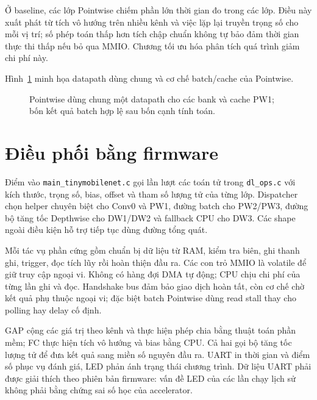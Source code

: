 Ở baseline, các lớp Pointwise chiếm phần lớn thời gian đo trong các lớp. Điều này xuất phát từ tích vô hướng trên nhiều kênh và việc lặp lại truyền trọng số cho mỗi vị trí; số phép toán thấp hơn tích chập chuẩn không tự bảo đảm thời gian thực thi thấp nếu bỏ qua MMIO. Chương tối ưu hóa phân tích quá trình giảm chi phí này.

Hình~\ref{fig:pw-placeholder} minh họa datapath dùng chung và cơ chế batch/cache của Pointwise.

\begin{figure}[!ht]
\captionsetup{aboveskip=6pt,belowskip=0pt}
\centering
\resizebox{0.93\textwidth}{!}{}
\caption{Pointwise dùng chung một datapath cho các bank và cache PW1; bốn kết quả batch hợp lệ sau bốn cạnh tính toán.}
\label{fig:pw-placeholder}
\end{figure}

\section{Điều phối bằng firmware}
Điểm vào \texttt{main\_tinymobilenet.c} gọi lần lượt các toán tử trong \texttt{dl\_ops.c} với kích thước, trọng số, bias, offset và tham số lượng tử của từng lớp. Dispatcher chọn helper chuyên biệt cho Conv0 và PW1, đường batch cho PW2/PW3, đường bộ tăng tốc Depthwise cho DW1/DW2 và fallback CPU cho DW3. Các shape ngoài điều kiện hỗ trợ tiếp tục dùng đường tổng quát.

Mỗi tác vụ phần cứng gồm chuẩn bị dữ liệu từ RAM, kiểm tra biên, ghi thanh ghi, trigger, đọc tích lũy rồi hoàn thiện đầu ra. Các con trỏ MMIO là volatile để giữ truy cập ngoại vi. Không có hàng đợi DMA tự động; CPU chịu chi phí của từng lần ghi và đọc. Handshake bus đảm bảo giao dịch hoàn tất, còn cơ chế chờ kết quả phụ thuộc ngoại vi; đặc biệt batch Pointwise dùng read stall thay cho polling hay delay cố định.

GAP cộng các giá trị theo kênh và thực hiện phép chia bằng thuật toán phần mềm; FC thực hiện tích vô hướng và bias bằng CPU. Cả hai gọi bộ tăng tốc lượng tử để đưa kết quả sang miền số nguyên đầu ra. UART in thời gian và điểm số phục vụ đánh giá, LED phản ánh trạng thái chương trình. Dữ liệu UART phải được giải thích theo phiên bản firmware: vấn đề LED của các lần chạy lịch sử không phải bằng chứng sai số học của accelerator.

